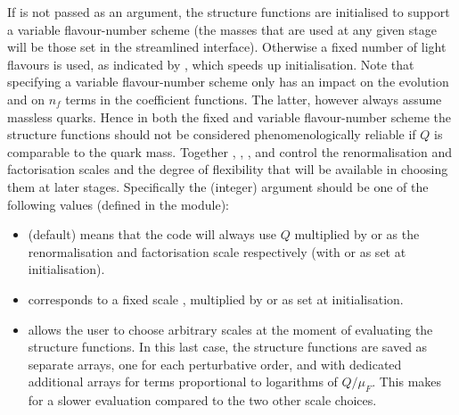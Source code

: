 If  is not passed as an argument, the structure functions
are initialised to support a variable flavour-number scheme (the
masses that are used at any given stage will be those set in the
streamlined interface).
%
Otherwise a fixed number of light flavours is used, as indicated by
, which speeds up initialisation.
%
Note that specifying a variable flavour-number scheme only has an
impact on the evolution and on $n_f$ terms in the coefficient
functions.
%
The latter, however always assume massless quarks.
%
Hence in both the fixed and variable flavour-number scheme the
structure functions should not be considered phenomenologically
reliable if $Q$ is comparable to the quark mass.
%
Together , , , and  control
the renormalisation and factorisation scales and the degree of
flexibility that will be available in choosing them at later stages.
%
Specifically the (integer) 
argument should be one of the following values (defined in the
 module):
\begin{itemize}
\item {} (default) means that the code will always
  use $Q$ multiplied by  or  as the renormalisation
  and factorisation scale respectively (with  or  as
  set at initialisation).
\item {} corresponds to a fixed scale
  , multiplied by  or  as set at
  initialisation.
\item {} allows the user to choose
  arbitrary scales at the moment of evaluating the structure
  functions.
  In this last case, the structure functions are saved as separate arrays, 
  one for each perturbative order, and with dedicated additional arrays
  for terms proportional to logarithms of $Q/\mu_F$. 
  This makes for a slower evaluation compared to the two other
  scale choices.
\end{itemize}
%
